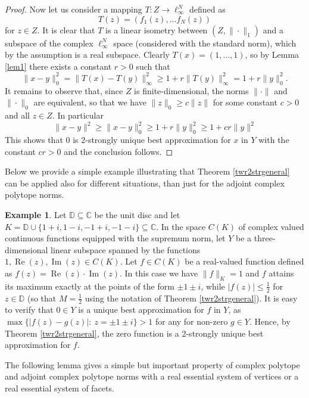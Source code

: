 \documentclass[12pt, reqno]{amsart}
\theoremstyle{definition}
\newtheorem{example}[twr]{Example}
\theoremstyle{remark}
\numberwithin{equation}{section}
\DeclareMathOperator{\re}{Re}
\DeclareMathOperator{\im}{Im}
\begin{document}
\begin{proof}
Now let us consider a mapping $T: Z \to \ell_{\infty}^N$ defined as
$$T(z)=(f_1(z), \ldots f_N(z))$$
for $z \in Z$. It is clear that $T$ is a linear isometry between $(Z, \| \cdot \|_1)$ and a subspace of the complex $\ell_{\infty}^N$ space (considered with the standard norm), which by the assumption is a real subspace. Clearly $T(x)=(1, \ldots, 1)$, so by Lemma \ref{lem1} there exists a constant $r>0$ such that
$$\|x-y\|^2_0 = \|T(x)-T(y)\|^2_{\infty} \geq 1 + r\|T(y)\|_{\infty}^2 = 1 + r\|y\|^2_0.$$
It remains to observe that, since $Z$ is finite-dimensional, the norms $\| \cdot \|$ and $\| \cdot \|_0$ are equivalent, so that we have $\|z\|_0 \geq c \|z\|$ for some constant $c>0$ and all $z \in Z$. In particular
$$\|x-y\|^2 \geq \|x-y\|^2_0 \geq 1 + r\|y\|^2_0 \geq 1 + cr \|y\|^2$$
This shows that $0$ is $2$-strongly unique best approximation for $x$ in $Y$ with the constant $cr>0$ and the conclusion follows.
\end{proof} 

Below we provide a simple example illustrating that Theorem \ref{twr2strgeneral} can be applied also for different situations, than just for the adjoint complex polytope norms.

\begin{example}
Let $\mathbb{D} \subseteq \mathbb{C}$ be the unit disc and let $K=\mathbb{D} \cup \{1+i, 1-i, -1+i, -1-i\} \subseteq \mathbb{C}.$ In the space $C(K)$ of complex valued continuous functions equipped with the supremum norm, let $Y$ be a three-dimensional linear subspace spanned by the functions $1, \re(z), \im(z) \in C(K)$. Let $f \in C(K)$ be a real-valued function defined as $f(z) = \re(z) \cdot \im(z)$. In this case we have $\|f\|_K=1$ and $f$ attains its maximum exactly at the points of the form $\pm 1 \pm i$, while $|f(z)| \leq \frac{1}{2}$ for $z \in \mathbb{D}$ (so that $M=\frac{1}{2}$ using the notation of Theorem \ref{twr2strgeneral}). It is easy to verify that $0 \in Y$ is a unique best approximation for $f$ in $Y$, as $\max\{|f(z)-g(z)|: \ z = \pm 1 \pm i \}>1$ for any for non-zero $g \in Y$. Hence, by Theorem \ref{twr2strgeneral}, the zero function is a $2$-strongly unique best approximation for $f$.

\end{example}

The following lemma gives a simple but important property of complex polytope and adjoint complex polytope norms with a real essential system of vertices or a real essential system of facets. 
\end{document}
